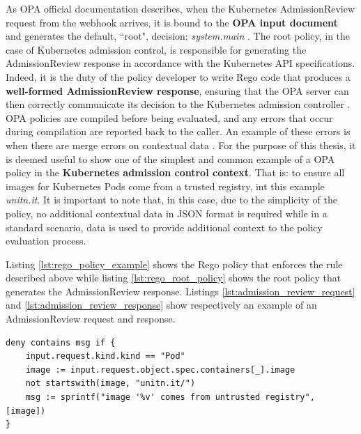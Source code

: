 As OPA official documentation describes, when the Kubernetes AdmissionReview request from the webhook arrives, it is bound to the \textbf{OPA input document} and generates the default, ``root", decision: \textit{system.main} \cite{opa_docs}.
The root policy, in the case of Kubernetes admission control, is responsible for generating the AdmissionReview response in accordance with the Kubernetes API specifications. 
Indeed, it is the duty of the policy developer to write Rego code that produces a \textbf{well-formed AdmissionReview response}, ensuring that the OPA server can then correctly communicate its decision to the Kubernetes admission controller \cite{opa_docs}.
OPA policies are compiled before being evaluated, and any errors that occur during compilation are reported back to the caller.
An example of these errors is when there are merge errors on contextual data \cite{opa_docs}.
For the purpose of this thesis, it is deemed useful to show one of the simplest and common example of a OPA policy in the \textbf{Kubernetes admission control context}. 
That is: to ensure all images for Kubernetes Pods come from a trusted registry, int this example \textit{unitn.it}.
It is important to note that, in this case, due to the simplicity of the policy, no additional contextual data in JSON format is required while in a standard scenario, data is used to provide additional context to the policy evaluation process. \newline

Listing \ref{lst:rego_policy_example} shows the Rego policy that enforces the rule described above while listing \ref{lst:rego_root_policy} shows the root policy that generates the AdmissionReview response.
Listings \ref{lst:admission_review_request} and \ref{lst:admission_review_response} show respectively an example of an AdmissionReview request and response. \newline

\begin{lstlisting}[language=Rego, caption={Rego policy for Pods registry}, label=lst:rego_policy_example]                              
deny contains msg if {                                                      
    input.request.kind.kind == "Pod"                                        
    image := input.request.object.spec.containers[_].image                  
    not startswith(image, "unitn.it/")                                     
    msg := sprintf("image '%v' comes from untrusted registry", [image])     
}
\end{lstlisting}

